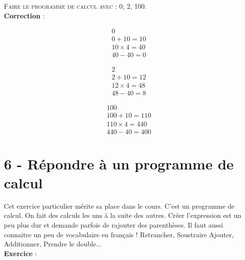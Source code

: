 \documentclass[11pt]{article}
\begin{document}
\textsc{Faire le programme de calcul avec : 0, 2, 100.} \\

\textbf{Correction} :

\begin{minipage}{0.3\textwidth}

\begin{align*}
& 0 \\
& 0 + 10 = 10 \\
& 10 \times 4 = 40\\
& 40 - 40 = 0
\end{align*}

\end{minipage}\begin{minipage}{0.3\textwidth}

\begin{align*}
& 2 \\
& 2 + 10 = 12 \\
& 12 \times 4 = 48\\
& 48 - 40 = 8
\end{align*}

\end{minipage}\begin{minipage}{0.3\textwidth}

\begin{align*}
& 100 \\
& 100 + 10 = 110 \\
& 110 \times 4 = 440\\
& 440 - 40 = 400
\end{align*}

\end{minipage}
\newpage

\section*{6 - Répondre à un programme de calcul}

Cet exercice particulier mérite sa place dans le cours. C'est un programme de calcul. On fait des calculs les uns à la suite des autres. Créer l'expression est un peu plus dur et demande parfois de rajouter des parenthèses. Il faut aussi connaitre un peu de vocabulaire en français ! Retrancher, Soustraire Ajouter, Additionner, Prendre le double... \\

\textbf{Exercice} : 

\begin{center}\end{center}
\end{document}
